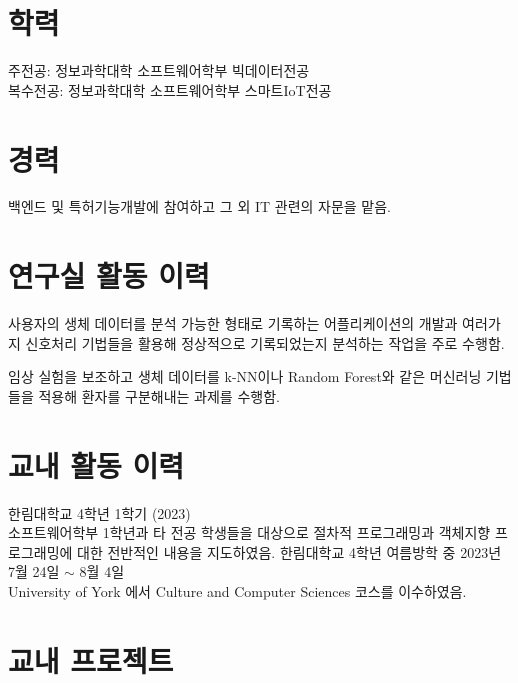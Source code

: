\documentclass[11pt,a4paper]{moderncv}
\title{}
\begin{document}
\maketitle

\section{학력}
{
주전공: 정보과학대학 소프트웨어학부 빅데이터전공\\
복수전공: 정보과학대학 소프트웨어학부 스마트IoT전공
}

\section{경력}
{
백엔드 및 특허기능개발에 참여하고 그 외 IT 관련의 자문을 맡음.
}

\section{연구실 활동 이력}
{사용자의 생체 데이터를 분석 가능한 형태로 기록하는 어플리케이션의 개발과 여러가지 신호처리 기법들을 활용해 정상적으로 기록되었는지 분석하는 작업을 주로 수행함.}

{임상 실험을 보조하고 생체 데이터를 k-NN이나 Random Forest와 같은 머신러닝 기법들을 적용해 환자를 구분해내는 과제를 수행함.}

\section{교내 활동 이력}
{{\footnotesize 한림대학교 4학년 1학기 (2023)}\\
    소프트웨어학부 1학년과 타 전공 학생들을 대상으로 절차적 프로그래밍과 객체지향 프로그래밍에 대한 전반적인 내용을 지도하였음.}
{{\footnotesize 한림대학교 4학년 여름방학 중 2023년 7월  24일 $\sim$ 8월  4일}\\
    University of York 에서 Culture and Computer Sciences 코스를 이수하였음.}

\section{교내 프로젝트}
\end{document}
